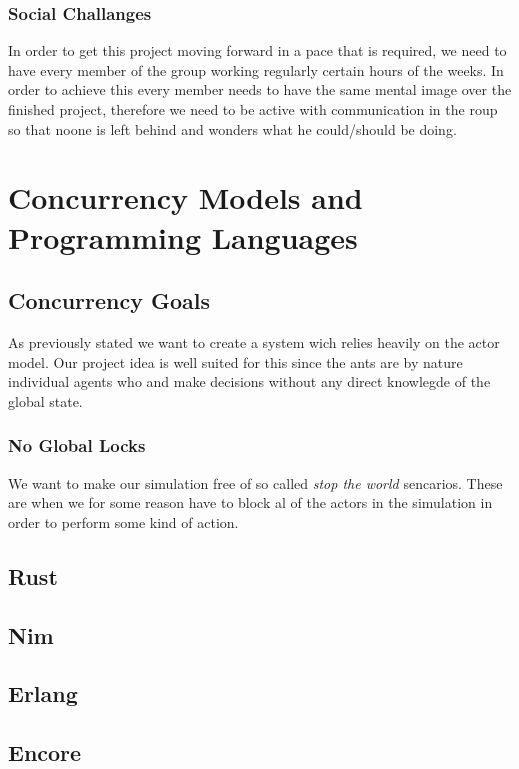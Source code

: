 \documentclass[a4paper]{article}
\begin{document}
\subsubsection{Social Challanges}
In order to get this project moving forward in a pace that is required, we need
to have every member of the group working regularly certain hours of the weeks.
In order to achieve this every member needs to have the same mental image over
the finished project, therefore we need to be active with communication in the
roup so that noone is left behind and wonders what he could/should be doing.

\section{Concurrency Models and Programming Languages}

\subsection{Concurrency Goals}
As previously stated we want to create a system wich relies heavily on the actor
model. Our project idea is well suited for this since the ants are by nature
individual agents who and make decisions without any direct knowlegde of the
global state.

\subsubsection{No Global Locks}

We want to make our simulation free of so called \emph{stop the world}
sencarios. These are when we for some reason have to block al of the actors in
the simulation in order to perform some kind of action.


\subsection{Rust}

\subsection{Nim}

\subsection{Erlang}

\subsection{Encore}
\end{document}
